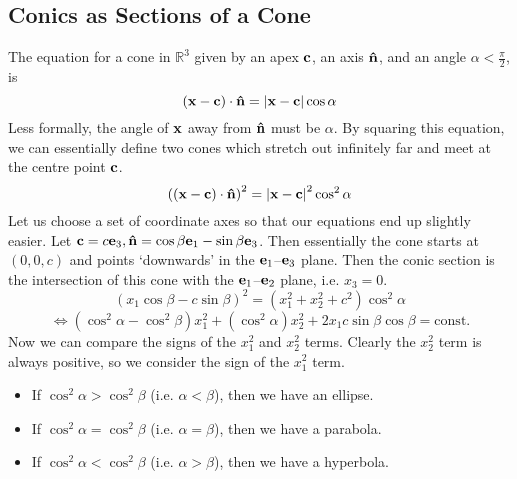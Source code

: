 \subsection{Conics as Sections of a Cone}
The equation for a cone in \(\mathbb R^3\) given by an apex \(\vb c\), an axis \(\vu n\), and an angle \(\alpha < \frac{\pi}{2}\), is
\[ (\vb x - \vb c)\cdot\vu n = \abs{\vb x - \vb c}\cos \alpha \]
Less formally, the angle of \(\vb x\) away from \(\vu n\) must be \(\alpha\). By squaring this equation, we can essentially define two cones which stretch out infinitely far and meet at the centre point \(\vb c\).
\[ \left( (\vb x - \vb c)\cdot\vu n \right)^2 = \abs{\vb x - \vb c}^2\cos^2 \alpha \]
Let us choose a set of coordinate axes so that our equations end up slightly easier. Let \(\vb c = c\vb e_3, \vu n = \cos\beta \vb e_1 - \sin\beta \vb e_3\). Then essentially the cone starts at \((0, 0, c)\) and points `downwards' in the \(\vb e_1\)--\(\vb e_3\) plane. Then the conic section is the intersection of this cone with the \(\vb e_1\)--\(\vb e_2\) plane, i.e. \(x_3 = 0\).
\[ (x_1\cos\beta - c\sin\beta)^2 = (x_1^2 + x_2^2 + c^2)\cos^2\alpha \]
\[ \iff (\cos^2\alpha - \cos^2\beta)x_1^2 + (\cos^2\alpha)x_2^2 + 2x_1c\sin\beta\cos\beta = \text{const.} \]
Now we can compare the signs of the \(x_1^2\) and \(x_2^2\) terms. Clearly the \(x_2^2\) term is always positive, so we consider the sign of the \(x_1^2\) term.
\begin{itemize}
	\item If \(\cos^2 \alpha > \cos^2\beta\) (i.e. \(\alpha < \beta\)), then we have an ellipse.
	\item If \(\cos^2 \alpha = \cos^2\beta\) (i.e. \(\alpha = \beta\)), then we have a parabola.
	\item If \(\cos^2 \alpha < \cos^2\beta\) (i.e. \(\alpha > \beta\)), then we have a hyperbola.
\end{itemize}
